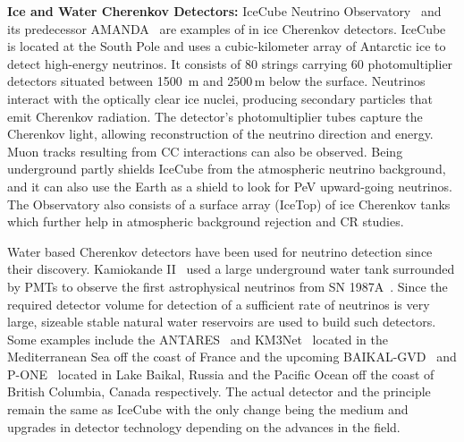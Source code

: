 \begin{description}
  \item \textbf{Ice and Water Cherenkov Detectors:} IceCube Neutrino Observatory~\cite{Aartsen_2017} and its predecessor AMANDA~\cite{WISCHNEWSKI1999412} are examples of in ice Cherenkov detectors. IceCube is located at the South Pole and uses a cubic-kilometer array of Antarctic ice to detect high-energy neutrinos. It consists of 80 strings carrying 60 photomultiplier detectors situated between 1500 m and 2500\,m below the surface. Neutrinos interact with the optically clear ice nuclei, producing secondary particles that emit Cherenkov radiation. The detector's photomultiplier tubes capture the Cherenkov light, allowing reconstruction of the neutrino direction and energy. Muon tracks resulting from CC interactions can also be observed. Being underground partly shields IceCube from the atmospheric neutrino background, and it can also use the Earth as a shield to look for PeV upward-going neutrinos. The Observatory also consists of a surface array (IceTop) of ice Cherenkov tanks which further help in atmospheric background rejection and CR studies. 
  
  Water based Cherenkov detectors have been used for neutrino detection since their discovery. Kamiokande II~\cite{Arisaka:1984aoa} used a large underground water tank surrounded by PMTs to observe the first astrophysical neutrinos from SN 1987A~\cite{PhysRevLett.58.1490}. Since the required detector volume for detection of a sufficient rate of neutrinos is very large, sizeable stable natural water reservoirs are used to build such detectors. Some examples include the ANTARES~\cite{CREUSOT2013489} and KM3Net~\cite{MARGIOTTA201483} located in the Mediterranean Sea off the coast of France and the upcoming BAIKAL-GVD~\cite{MALYSHKIN2023168117} and P-ONE~\cite{P-ONE:2020ljt} located in Lake Baikal, Russia and the Pacific Ocean off the coast of British Columbia, Canada respectively. The actual detector and the principle remain the same as IceCube with the only change being the medium and upgrades in detector technology depending on the advances in the field. 
  

\end{description}
